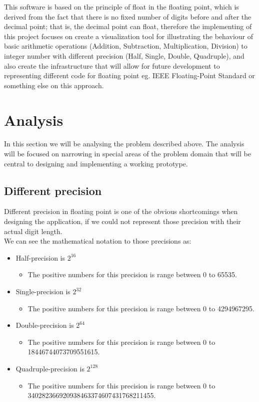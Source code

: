 \documentclass[11pt]{article}
\begin{document}
This software is based on the principle of float in the floating point, which is derived from the fact that there is no fixed number of digits before and after the decimal point; that is, the decimal point can float, therefore the implementing of this project focuses on create a visualization tool for illustrating the behaviour of basic arithmetic operations (Addition, Subtraction, Multiplication, Division) to integer number with different precision (Half, Single, Double, Quadruple), and also create the infrastructure that will allow for future development to representing different code for floating point eg. IEEE Floating-Point Standard or something else on this approach.

\section{Analysis}
In this section we will be analysing the problem described above. The analysis will be focused on narrowing in special areas of the problem domain that will be central to designing and implementing a working prototype.
\subsection{Different precision}%
Different precision in floating point is one of the obvious shortcomings when designing the application, if we could not represent those precision with their actual digit length.\\
We can see the mathematical notation to those precisions as:
\begin{itemize}
\item{Half-precision is $2^{16}$}
\begin{itemize}\item[]{The positive numbers for this precision is range between 0 to 65535.}\end{itemize}
\item{Single-precision is $2^{32}$}
\begin{itemize}\item[]{The positive numbers for this precision is range between 0 to 4294967295.}\end{itemize}
\item{Double-precision is $2^{64}$}
\begin{itemize}\item[]{The positive numbers for this precision is range between 0 to 18446744073709551615.}\end{itemize}
\item{Quadruple-precision is $2^{128}$}
\begin{itemize}\item[]{The positive numbers for this precision is range between 0 to \\340282366920938463374607431768211455.}\end{itemize}
\end{itemize}
\end{document}
